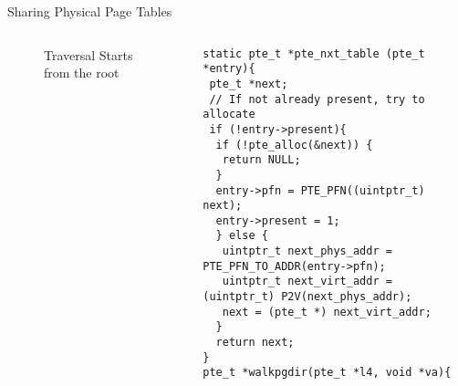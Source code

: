 \documentclass[aspectratio=169,xcolor=dvipsnames]{beamer}
\begin{document}
\begin{frame}[fragile]{Sharing Physical Page Tables}
\begin{columns}[c]
\begin{figure}
\begin{tikzpicture}[x=0.75pt,y=0.75pt,yscale=-0.5,xscale=0.5]
\end{tikzpicture}
        \caption{Traversal Starts from the \textsf{root}}
        \label{fig:enter-label}
    \end{figure}
\begin{lstlisting}[style=CStyleNum, basicstyle=\tiny]
static pte_t *pte_nxt_table (pte_t *entry){
 pte_t *next;
 // If not already present, try to allocate
 if (!entry->present){
  if (!pte_alloc(&next)) {
   return NULL;
  }
  entry->pfn = PTE_PFN((uintptr_t) next);
  entry->present = 1;
  } else {
   uintptr_t next_phys_addr = PTE_PFN_TO_ADDR(entry->pfn);        
   uintptr_t next_virt_addr = (uintptr_t) P2V(next_phys_addr);
   next = (pte_t *) next_virt_addr;
  }
  return next;
}   
pte_t *walkpgdir(pte_t *l4, void *va){ 
\end{lstlisting}
\end{columns}
\end{frame}
\end{document}
